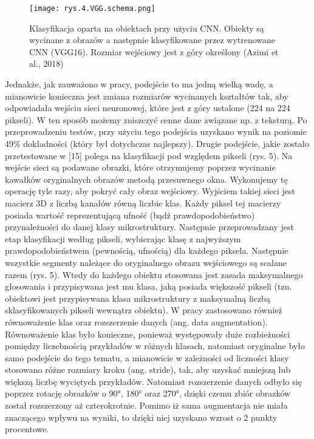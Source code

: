 \begin{figure}[h]
    \centering
    \texttt{[image: rys.4.VGG.schema.png]}
    \caption{Klasyfikacja oparta na obiektach przy użyciu CNN. Obiekty są wycinane z obrazów a następnie klasyfikowane przez wytrenowane CNN (VGG16). Rozmiar wejściowy jest z góry określony (Azimi et al., 2018)}
    \label{fig:mesh4}
\end{figure}

Jednakże, jak zauważono w pracy, podejście to ma jedną wielką wadę, a mianowicie konieczna jest zmiana rozmiarów wycinanych kształtów tak, aby odpowiadała wejściu sieci neuronowej, które jest z góry ustalone (224 na 224 pikseli). W ten sposób możemy zniszczyć cenne dane związane np. z teksturą. Po przeprowadzeniu testów, przy użyciu tego podejścia uzyskano wynik na poziomie 49\% dokładności (który był dotychczas najlepszy). Drugie podejście, jakie zostało przetestowane w [15] polega na klasyfikacji pod względem pikseli (rys. 5). Na wejście sieci są podawane obrazki, które otrzymujemy poprzez wycinanie kawałków oryginalnych obrazów metodą przesuwnego okna. Wykonujemy tę operację tyle razy, aby pokryć cały obraz wejściowy. Wyjściem takiej sieci jest macierz 3D z liczbą kanałów równą liczbie klas. Każdy piksel tej macierzy posiada wartość reprezentującą ufność (bądź prawdopodobieństwo) przynależności do danej klasy mikrostruktury. Następnie przeprowadzany jest etap klasyfikacji według pikseli, wybierając klasę z najwyższym prawdopodobieństwem (pewnością, ufnością) dla każdego piksela. Następnie wszystkie segmenty należące do oryginalnego obrazu wejściowego są scalane razem (rys. 5). Wtedy do każdego obiektu stosowana jest zasada maksymalnego głosowania i przypisywana jest mu klasa, jaką posiada większość pikseli (tzn. obiektowi jest przypisywana klasa mikrostruktury z maksymalną liczbą sklasyfikowanych pikseli wewnątrz obiektu). W pracy zastosowano również równoważenie klas oraz rozszerzenie danych (ang. data augmentation). Równoważenie klas było konieczne, ponieważ występowały duże rozbieżności pomiędzy liczebnością przykładów w różnych klasach, natomiast oryginalne było samo podejście do tego tematu, a mianowicie w zależności od liczności klasy stosowano różne rozmiary kroku (ang. stride), tak, aby uzyskać mniejszą lub większą liczbę wyciętych przykładów. Natomiast rozszerzenie danych odbyło się poprzez rotację obrazków o 90°, 180° oraz 270°, dzięki czemu zbiór obrazków został rozszerzony aż czterokrotnie. Pomimo iż sama augmentacja nie miała znaczącego wpływu na wyniki, to dzięki niej uzyskano wzrost o 2 punkty procentowe.

